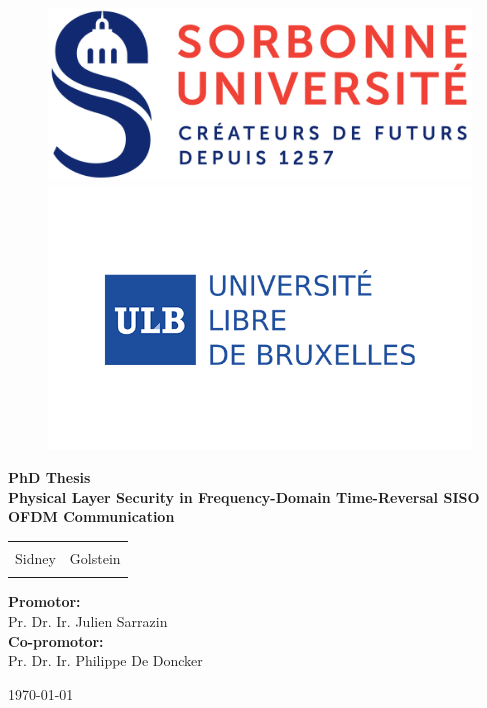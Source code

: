 \begin{titlepage}
\graphicspath{{00_frontmatter/}}


\begin{figure}[!htb]
    \centering
        \includegraphics[width=0.55\linewidth]{img/sorbonne_logo.png}
    \endminipage 
    \centering
        \includegraphics[width=0.8\linewidth]{img/logo_ulb.png}
    \endminipage
\end{figure} 

\begin{center}

\huge{\bf{PhD Thesis}}\\[0.5in]

\LARGE{ \textbf {Physical Layer Security in Frequency-Domain Time-Reversal SISO OFDM Communication}}\\[0.5in]


\begin{table}[h]
\begin{center}
\begin{tabular}{ll}\hline \\

\Large{Sidney} & \Large{Golstein} \\ \\
\hline 
\end{tabular}
\end{center}
\end{table}

\vspace{0.5in}
\Large{\textbf{Promotor:}}\\
\Large{Pr. Dr. Ir. Julien Sarrazin}\\[0.3in]
\Large{\textbf{Co-promotor:}} \\
\Large{Pr. Dr. Ir. Philippe De Doncker}\\[0.1in]

\vspace{1.3in}


\vfill

\Large{\hfill{\today}}


\end{center}

\end{titlepage}
